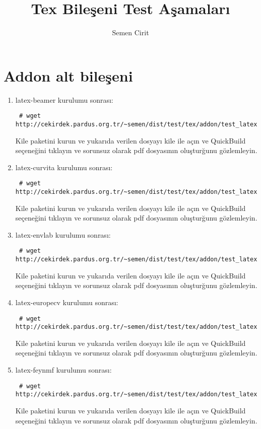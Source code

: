 \documentclass[a4paper,10pt]{article}
\title{Tex Bileşeni Test Aşamaları}
\author{Semen Cirit}
\begin{document}
\maketitle
\section{Addon alt bileşeni}
\begin{enumerate}
\item  latex-beamer kurulumu sonrası:
\begin{verbatim}
 # wget http://cekirdek.pardus.org.tr/~semen/dist/test/tex/addon/test_latexbeamer.tex
\end{verbatim}

Kile paketini kurun ve yukarıda verilen dosyayı kile ile açın ve QuickBuild  seçeneğini tıklayın ve sorunsuz olarak pdf dosyasının oluşturğunu gözlemleyin.
\item  latex-curvita kurulumu sonrası:
\begin{verbatim}
 # wget http://cekirdek.pardus.org.tr/~semen/dist/test/tex/addon/test_latexcurrvita.tex
\end{verbatim}

Kile paketini kurun ve yukarıda verilen dosyayı kile ile açın ve QuickBuild  seçeneğini tıklayın ve sorunsuz olarak pdf dosyasının oluşturğunu gözlemleyin.
\item  latex-envlab kurulumu sonrası:
\begin{verbatim}
 # wget http://cekirdek.pardus.org.tr/~semen/dist/test/tex/addon/test_latexenvlab.tex
\end{verbatim}

Kile paketini kurun ve yukarıda verilen dosyayı kile ile açın ve QuickBuild  seçeneğini tıklayın ve sorunsuz olarak pdf dosyasının oluşturğunu gözlemleyin.
\item  latex-europecv kurulumu sonrası:
\begin{verbatim}
 # wget http://cekirdek.pardus.org.tr/~semen/dist/test/tex/addon/test_latexeuropecv.tex
\end{verbatim}

Kile paketini kurun ve yukarıda verilen dosyayı kile ile açın ve QuickBuild  seçeneğini tıklayın ve sorunsuz olarak pdf dosyasının oluşturğunu gözlemleyin.
\item  latex-feynmf kurulumu sonrası:
\begin{verbatim}
 # wget http://cekirdek.pardus.org.tr/~semen/dist/test/tex/addon/test_latexfeynmf.tex
\end{verbatim}

Kile paketini kurun ve yukarıda verilen dosyayı kile ile açın ve QuickBuild  seçeneğini tıklayın ve sorunsuz olarak pdf dosyasının oluşturğunu gözlemleyin.
\end{enumerate}
\end{document}

